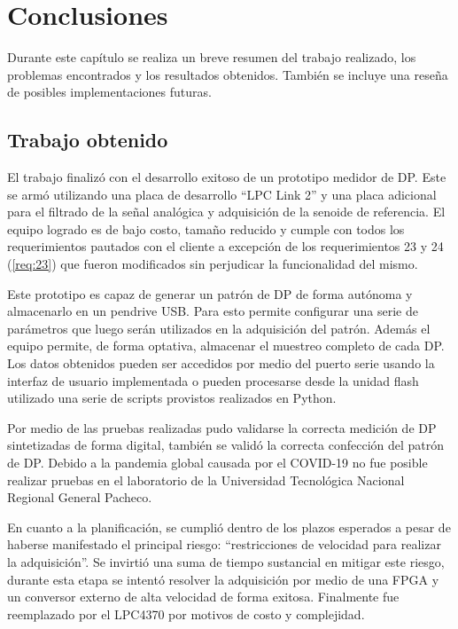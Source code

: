 
\chapter{Conclusiones} %

\label{Chapter5} %
Durante este capítulo se realiza un breve resumen del trabajo realizado, los problemas encontrados y los resultados obtenidos. También se incluye una reseña de posibles implementaciones futuras.\label{a:a}

\section{Trabajo obtenido}

El trabajo finalizó con el desarrollo exitoso de un prototipo medidor de DP. Este se armó utilizando una placa de desarrollo “LPC Link 2” y una placa adicional para el filtrado de la señal analógica y adquisición de la senoide de referencia. El equipo logrado es de bajo costo, tamaño reducido y cumple con todos los requerimientos pautados con el cliente a excepción de los requerimientos 23 y 24 (\ref{req:23}) que fueron modificados sin perjudicar la funcionalidad del mismo.

Este prototipo es capaz de generar un patrón de DP de forma autónoma y almacenarlo en un pendrive USB. Para esto permite configurar una serie de parámetros que luego serán utilizados en la adquisición del patrón. Además el equipo permite, de forma optativa, almacenar el muestreo completo de cada DP. Los datos obtenidos pueden ser accedidos por medio del puerto serie usando la interfaz de usuario implementada o pueden procesarse desde la unidad flash utilizado una serie de scripts provistos realizados en Python.

Por medio de las pruebas realizadas pudo validarse la correcta medición de DP sintetizadas de forma digital, también se validó la correcta confección del patrón de DP. Debido a la pandemia global causada por el COVID-19 no fue posible realizar pruebas en el laboratorio de la Universidad Tecnológica Nacional Regional General Pacheco.

En cuanto a la planificación, se cumplió dentro de los plazos esperados a pesar de haberse manifestado el principal riesgo: “restricciones de velocidad para realizar la adquisición”. Se invirtió una suma de tiempo sustancial en mitigar este riesgo, durante esta etapa se intentó resolver la adquisición por medio de una FPGA y un conversor externo de alta velocidad de forma exitosa. Finalmente fue reemplazado por el LPC4370 por motivos de costo y complejidad.


